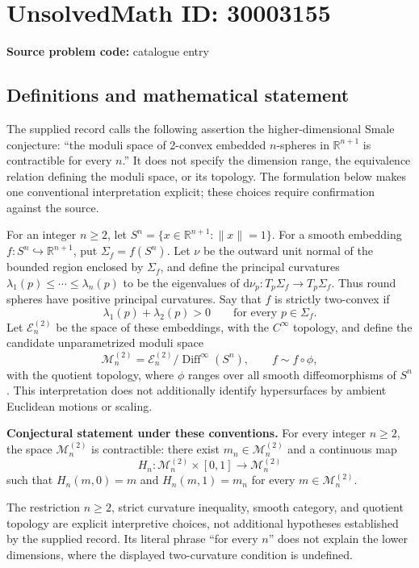 \documentclass[11pt]{article}
\newcommand{\R}{\mathbb{R}}
\begin{document}
\section*{UnsolvedMath ID: 30003155}
\textbf{Source problem code:} catalogue entry
\subsection{Definitions and mathematical statement}
The supplied record calls the following assertion the higher-dimensional Smale conjecture: ``the moduli space of 2-convex embedded \(n\)-spheres in \(\R^{n+1}\) is contractible for every \(n\).'' It does not specify the dimension range, the equivalence relation defining the moduli space, or its topology. The formulation below makes one conventional interpretation explicit; these choices require confirmation against the source.

For an integer \(n\geq 2\), let \(S^n=\{x\in\R^{n+1}:\lVert x\rVert=1\}\). For a smooth embedding \(f:S^n\hookrightarrow\R^{n+1}\), put \(\Sigma_f=f(S^n)\). Let \(\nu\) be the outward unit normal of the bounded region enclosed by \(\Sigma_f\), and define the principal curvatures \(\lambda_1(p)\leq\cdots\leq\lambda_n(p)\) to be the eigenvalues of \(\mathrm d\nu_p:T_p\Sigma_f\to T_p\Sigma_f\). Thus round spheres have positive principal curvatures. Say that \(f\) is strictly two-convex if
\[
\lambda_1(p)+\lambda_2(p)>0\qquad\text{for every }p\in\Sigma_f.
\]
Let \(\mathcal E_n^{(2)}\) be the space of these embeddings, with the \(C^\infty\) topology, and define the candidate unparametrized moduli space
\[
\mathcal M_n^{(2)}=\mathcal E_n^{(2)}/\operatorname{Diff}^{\infty}(S^n),
\qquad f\sim f\circ\phi,
\]
with the quotient topology, where \(\phi\) ranges over all smooth diffeomorphisms of \(S^n\). This interpretation does not additionally identify hypersurfaces by ambient Euclidean motions or scaling.

\textbf{Conjectural statement under these conventions.} For every integer \(n\geq2\), the space \(\mathcal M_n^{(2)}\) is contractible: there exist \(m_n\in\mathcal M_n^{(2)}\) and a continuous map
\[
H_n:\mathcal M_n^{(2)}\times[0,1]\longrightarrow\mathcal M_n^{(2)}
\]
such that \(H_n(m,0)=m\) and \(H_n(m,1)=m_n\) for every \(m\in\mathcal M_n^{(2)}\).

The restriction \(n\geq2\), strict curvature inequality, smooth category, and quotient topology are explicit interpretive choices, not additional hypotheses established by the supplied record. Its literal phrase ``for every \(n\)'' does not explain the lower dimensions, where the displayed two-curvature condition is undefined.
\end{document}
